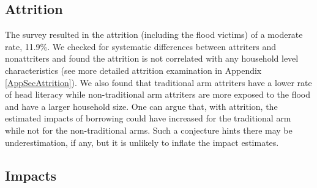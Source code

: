 


\subsection{Attrition}
\label{SecAttrition}

	The survey resulted in the attrition (including the flood victims) of a moderate rate, 11.9\%. We checked for systematic differences between attriters and nonattriters 
	and found the attrition is not correlated with any household level characteristics (see more detailed attrition examination in Appendix \ref{AppSecAttrition}). %
	We also found that \textsf{traditional} arm attriters have a lower rate of head literacy while non-\textsf{traditional} arm attriters are more exposed to the flood and have a larger household size. One can argue that, with attrition, the estimated impacts of borrowing could have increased for the \textsf{traditional} arm while not for the non-\textsf{traditional} arms. Such a conjecture hints there may be underestimation, if any, but it is unlikely to inflate the impact estimates.

\subsection{Impacts}
\label{Sec Impacts}




